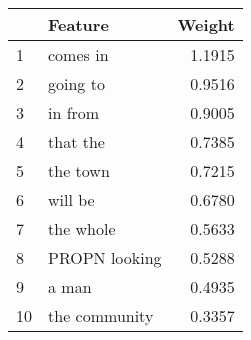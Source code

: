 \begin{tabular}{llr}
\toprule
{} &        Feature &  Weight \\
\midrule
1  &       comes in &  1.1915 \\
2  &       going to &  0.9516 \\
3  &        in from &  0.9005 \\
4  &       that the &  0.7385 \\
5  &       the town &  0.7215 \\
6  &        will be &  0.6780 \\
7  &      the whole &  0.5633 \\
8  &  PROPN looking &  0.5288 \\
9  &          a man &  0.4935 \\
10 &  the community &  0.3357 \\
\bottomrule
\end{tabular}
